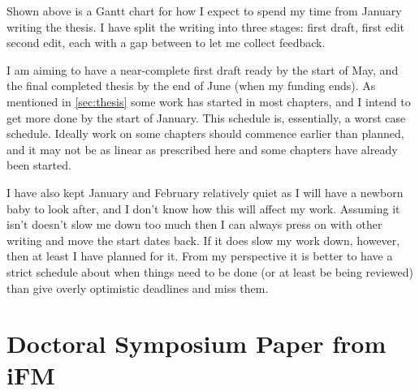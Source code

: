\documentclass[a4paper]{scrartcl}
\begin{document}
Shown above is a Gantt chart for how I expect to spend my time from January
writing the thesis.  I have split the writing into three stages: first draft,
first edit second edit, each with a gap between to let me collect feedback.

I am aiming to have a near-complete first draft ready by the start of May, and
the final completed thesis by the end of June (when my funding ends). As
mentioned in \autoref{sec:thesis} some work has started in most chapters, and I
intend to get more done by the start of January.  This schedule is,
essentially, a worst case schedule.  Ideally work on some chapters should
commence earlier than planned, and it may not be as linear as prescribed here
and some chapters have already been started.

I have also kept January and February relatively quiet as I will have a newborn
baby to look after, and I don't know how this will affect my work. Assuming it
isn't doesn't slow me down too much then I can always press on with other
writing and move the start dates back.  If it does slow my work down, however,
then at least I have planned for it.  From my perspective it is better to have
a strict schedule about when things need to be done (or at least be being
reviewed) than give overly optimistic deadlines and miss them.

\pagebreak
\section{Doctoral Symposium Paper from iFM}
\label{sec:paper}

\end{document}
